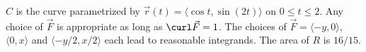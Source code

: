 {$C$ is the curve parametrized by $\vec r(t) = \langle \cos t,\sin (2t)\rangle$ on $0\leq t\leq 2$. 
}
{Any choice of $\vec F$ is appropriate as long as $\curl \vec F = 1$. The choices of  $\vec F = \langle -y,0\rangle$, $\langle 0,x\rangle$ and $\langle -y/2,x/2\rangle$ each lead to reasonable integrands. The area of $R$ is $16/15$.
}

